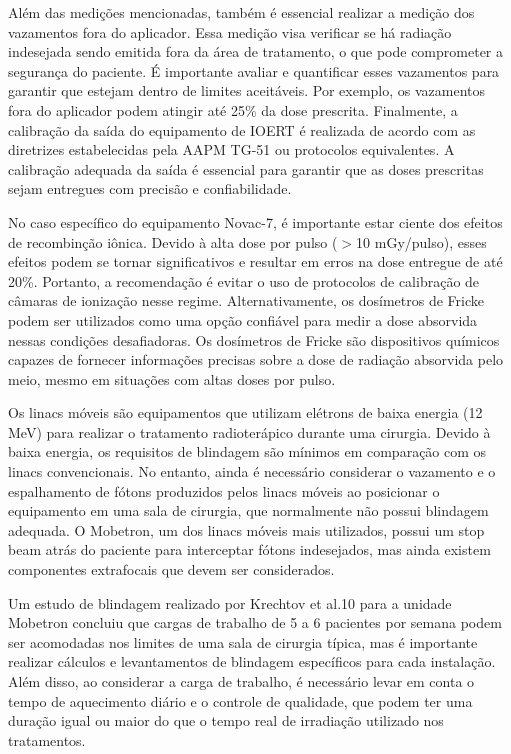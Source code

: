 \documentclass[11pt,a4paper]{article}
\newcounter{exemplo}
\begin{document}
	Além das medições mencionadas, também é essencial realizar a medição dos vazamentos fora do aplicador. Essa medição visa verificar se há radiação indesejada sendo emitida fora da área de tratamento, o que pode comprometer a segurança do paciente. É importante avaliar e quantificar esses vazamentos para garantir que estejam dentro de limites aceitáveis. Por exemplo, os vazamentos fora do aplicador podem atingir até 25\% da dose prescrita. Finalmente, a calibração da saída do equipamento de IOERT é realizada de acordo com as diretrizes estabelecidas pela AAPM TG-51 ou protocolos equivalentes. A calibração adequada da saída é essencial para garantir que as doses prescritas sejam entregues com precisão e confiabilidade.

	No caso específico do equipamento Novac-7, é importante estar ciente dos efeitos de recombinção iônica. Devido à alta dose por pulso ($>$10 mGy/pulso), esses efeitos podem se tornar significativos e resultar em erros na dose entregue de até 20\%. Portanto, a recomendação é evitar o uso de protocolos de calibração de câmaras de ionização nesse regime. Alternativamente, os dosímetros de Fricke podem ser utilizados como uma opção confiável para medir a dose absorvida nessas condições desafiadoras. Os dosímetros de Fricke são dispositivos químicos capazes de fornecer informações precisas sobre a dose de radiação absorvida pelo meio, mesmo em situações com altas doses por pulso.

	Os linacs móveis são equipamentos que utilizam elétrons de baixa energia (12 MeV) para realizar o tratamento radioterápico durante uma cirurgia. Devido à baixa energia, os requisitos de blindagem são mínimos em comparação com os linacs convencionais. No entanto, ainda é necessário considerar o vazamento e o espalhamento de fótons produzidos pelos linacs móveis ao posicionar o equipamento em uma sala de cirurgia, que normalmente não possui blindagem adequada. O Mobetron, um dos linacs móveis mais utilizados, possui um stop beam atrás do paciente para interceptar fótons indesejados, mas ainda existem componentes extrafocais que devem ser considerados.

	Um estudo de blindagem realizado por Krechtov et al.10 para a unidade Mobetron concluiu que cargas de trabalho de 5 a 6 pacientes por semana podem ser acomodadas nos limites de uma sala de cirurgia típica, mas é importante realizar cálculos e levantamentos de blindagem específicos para cada instalação. Além disso, ao considerar a carga de trabalho, é necessário levar em conta o tempo de aquecimento diário e o controle de qualidade, que podem ter uma duração igual ou maior do que o tempo real de irradiação utilizado nos tratamentos.
\end{document}
